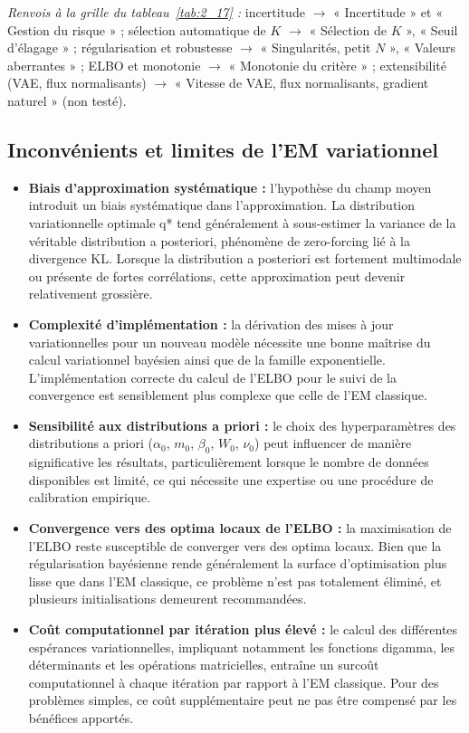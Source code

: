 \par\noindent\emph{Renvois à la grille du tableau~\ref{tab:2_17} :} incertitude $\to$ « Incertitude » et « Gestion du risque » ; sélection automatique de $K$ $\to$ « Sélection de $K$ », « Seuil d'élagage » ; régularisation et robustesse $\to$ « Singularités, petit $N$ », « Valeurs aberrantes » ; ELBO et monotonie $\to$ « Monotonie du critère » ; extensibilité (VAE, flux normalisants) $\to$ « Vitesse de VAE, flux normalisants, gradient naturel » (non testé).
\subsection{Inconvénients et limites de l'EM variationnel}
\begin{itemize}
\item \textbf{Biais d'approximation systématique : }l'hypothèse du champ moyen introduit un biais systématique dans l'approximation. La distribution variationnelle optimale q* tend généralement à sous-estimer la variance de la véritable distribution a posteriori, phénomène de zero-forcing lié à la divergence KL. Lorsque la distribution a posteriori est fortement multimodale ou présente de fortes corrélations, cette approximation peut devenir relativement grossière.
\item \textbf{Complexité d'implémentation : }la dérivation des mises à jour variationnelles pour un nouveau modèle nécessite une bonne maîtrise du calcul variationnel bayésien ainsi que de la famille exponentielle. L'implémentation correcte du calcul de l'ELBO pour le suivi de la convergence est sensiblement plus complexe que celle de l'EM classique.
\item \textbf{Sensibilité aux distributions a priori : }le choix des hyperparamètres des distributions a priori ($\alpha _{0}$, $m_{0}$, $\beta _{0}$, $W_{0}$, $\nu _{0}$) peut influencer de manière significative les résultats, particulièrement lorsque le nombre de données disponibles est limité, ce qui nécessite une expertise ou une procédure de calibration empirique.
\item \textbf{Convergence vers des optima locaux de l'ELBO : }la maximisation de l'ELBO reste susceptible de converger vers des optima locaux. Bien que la régularisation bayésienne rende généralement la surface d'optimisation plus lisse que dans l'EM classique, ce problème n'est pas totalement éliminé, et plusieurs initialisations demeurent recommandées.
\item \textbf{Coût computationnel par itération plus élevé : }le calcul des différentes espérances variationnelles, impliquant notamment les fonctions digamma, les déterminants et les opérations matricielles, entraîne un surcoût computationnel à chaque itération par rapport à l'EM classique. Pour des problèmes simples, ce coût supplémentaire peut ne pas être compensé par les bénéfices apportés.

\end{itemize}

